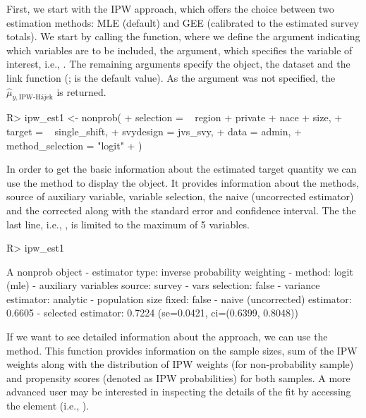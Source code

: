 \documentclass[
]{jss}
\begin{document}
First, we start with the IPW approach, which offers the choice between
two estimation methods: MLE (default) and GEE (calibrated to the
estimated survey totals). We start by calling the 
function, where we define the  argument indicating which
variables are to be included, the  argument, which
specifies the variable of interest, i.e., . The
remaining arguments specify the  object, the dataset and
the link function (;  is the
default value). As the  argument was not specified, the
\(\hat{\mu}_{y,\text{IPW-H\'{a}jek}}\) is returned.

\begin{CodeChunk}
\begin{CodeInput}
R> ipw_est1 <- nonprob(
+   selection = ~ region + private + nace + size,
+   target = ~ single_shift,
+   svydesign = jvs_svy,
+   data = admin,
+   method_selection = "logit"
+ )
\end{CodeInput}
\end{CodeChunk}

In order to get the basic information about the estimated target
quantity we can use the  method to display the object. It
provides information about the methods, source of auxiliary variable,
variable selection, the naive (uncorrected estimator) and the corrected
along with the standard error and confidence interval. The the last
line, i.e., , is limited to the maximum of 5
variables.

\begin{CodeChunk}
\begin{CodeInput}
R> ipw_est1
\end{CodeInput}
\begin{CodeOutput}
A nonprob object
 - estimator type: inverse probability weighting
 - method: logit (mle)
 - auxiliary variables source: survey
 - vars selection: false
 - variance estimator: analytic
 - population size fixed: false
 - naive (uncorrected) estimator: 0.6605
 - selected estimator: 0.7224 (se=0.0421, ci=(0.6399, 0.8048))
\end{CodeOutput}
\end{CodeChunk}

If we want to see detailed information about the approach, we can use
the  method. This function provides information on the
sample sizes, sum of the IPW weights along with the distribution of IPW
weights (for non-probability sample) and propensity scores (denoted as
IPW probabilities) for both samples. A more advanced user may be
interested in inspecting the details of the fit by accessing the
 element (i.e., ).
\end{document}
